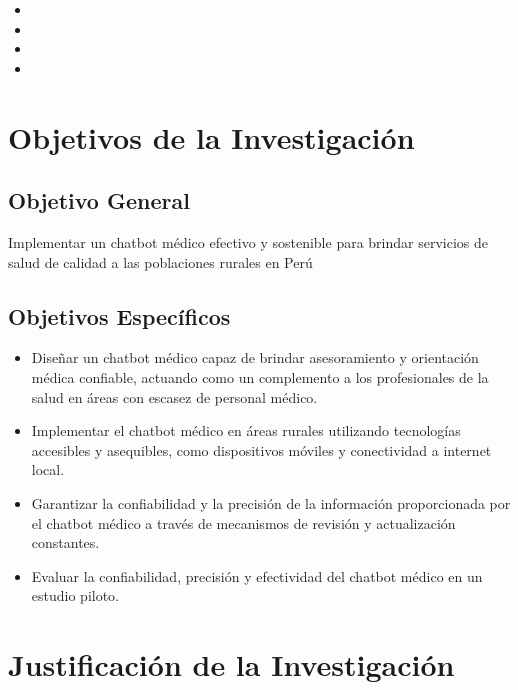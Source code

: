 \begin{itemize}
	\item \Pbone
	\item \Pbtwo
	\item \Pbthree
	\item \Pbfour

\end{itemize}

\section{Objetivos de la Investigación}

\subsection{Objetivo General}
\newcommand{\ObjetivoGeneral}{
Implementar un chatbot médico efectivo y sostenible para brindar servicios de salud de calidad a las poblaciones rurales en Perú
}
\ObjetivoGeneral
\subsection{Objetivos Espec\'{i}ficos}
\newcommand{\Objone}{
Diseñar un chatbot médico capaz de brindar asesoramiento y orientación médica confiable, actuando como un complemento a los profesionales de la salud en áreas con escasez de personal médico.
}
\newcommand{\Objtwo}{
Implementar el chatbot médico en áreas rurales utilizando tecnologías accesibles y asequibles, como dispositivos móviles y conectividad a internet local.
}
\newcommand{\Objthree}{
Garantizar la confiabilidad y la precisión de la información proporcionada por el chatbot médico a través de mecanismos de revisión y actualización constantes.
}
\newcommand{\Objfour}{
Evaluar la confiabilidad, precisión y efectividad del chatbot médico en un estudio piloto.
}


\begin{itemize}
	\item {\Objone}
	\item {\Objtwo}
	\item {\Objthree}
	\item {\Objfour}

\end{itemize}

\section{Justificación de la Investigación}

